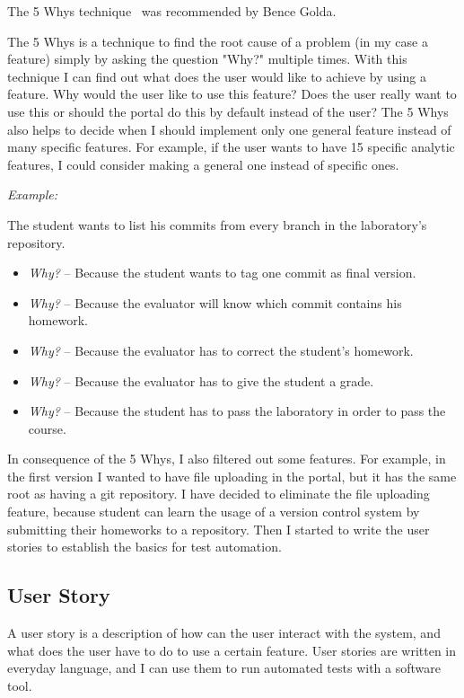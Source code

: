 The 5 Whys technique~\cite{5-why-article} was recommended by Bence Golda. 

The 5 Whys is a technique to find the root cause of a problem (in my case a feature) simply by asking the question "Why?" multiple times. With this technique I can find out what does the user would like to achieve by using a feature. Why would the user like to use this feature? Does the user really want to use this or should the portal do this by default instead of the user? The 5 Whys also helps to decide when I should implement only one general feature instead of many specific features. For example, if the user wants to have 15 specific analytic features, I could consider making a general one instead of specific ones. 

\emph{Example:}

The student wants to list his commits from every branch in the laboratory's repository.
\begin{itemize}
	\item \emph{Why?} -- Because the student wants to tag one commit as final version.
	\item \emph{Why?} -- Because the evaluator will know which commit contains his homework.
	\item \emph{Why?} -- Because the evaluator has to correct the student's homework.
	\item \emph{Why?} -- Because the evaluator has to give the student a grade.
	\item \emph{Why?} -- Because the student has to pass the laboratory in order to pass the course.
\end{itemize}

In consequence of the 5 Whys, I also filtered out some features. For example, in the first version I wanted to have file uploading in the portal, but it has the same root as having a git repository. I have decided to eliminate the file uploading feature, because student can learn the usage of a version control system by submitting their homeworks to a repository. Then I started to write the user stories to establish the basics for test automation.

\subsection{User Story}\label{spec-user-story}
A user story is a description of how can the user interact with the system, and what does the user have to do to use a certain feature. User stories are written in everyday language, and I can use them to run automated tests with a software tool. 

